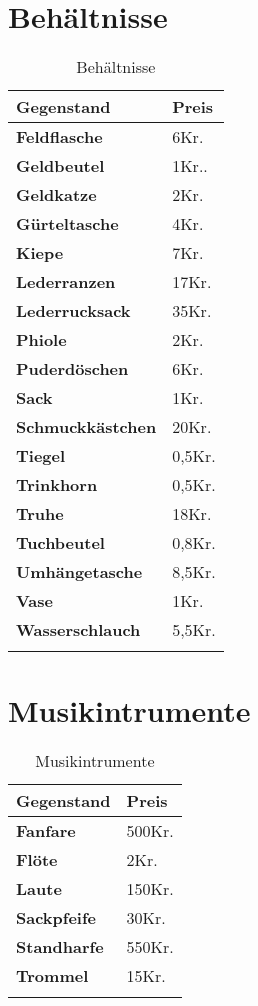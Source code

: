 \section{Behältnisse}
\begin{longtable}{|p{5cm}|p{2cm}|}
\hline
\textbf{Gegenstand} & \textbf{Preis} \\ \hline
\textbf{Feldflasche} & 6Kr. \\ \hline
\textbf{Geldbeutel} & 1Kr.. \\ \hline
\textbf{Geldkatze} & 2Kr. \\ \hline
\textbf{Gürteltasche} & 4Kr. \\ \hline
\textbf{Kiepe} & 7Kr. \\ \hline
\textbf{Lederranzen} & 17Kr. \\ \hline
\textbf{Lederrucksack} & 35Kr. \\ \hline
\textbf{Phiole} & 2Kr. \\ \hline
\textbf{Puderdöschen} & 6Kr. \\ \hline
\textbf{Sack} & 1Kr. \\ \hline
\textbf{Schmuckkästchen} & 20Kr. \\ \hline
\textbf{Tiegel} & 0,5Kr. \\ \hline
\textbf{Trinkhorn} & 0,5Kr. \\ \hline
\textbf{Truhe} & 18Kr. \\ \hline
\textbf{Tuchbeutel} & 0,8Kr. \\ \hline
\textbf{Umhängetasche} & 8,5Kr. \\ \hline
\textbf{Vase} & 1Kr. \\ \hline
\textbf{Wasserschlauch} & 5,5Kr. \\ \hline

\caption{Behältnisse}
\label{tab:Behältnisse}
\end{longtable}


\section{Musikintrumente}
\begin{longtable}{|p{5cm}|p{2cm}|}
\hline
\textbf{Gegenstand} & \textbf{Preis} \\ \hline
\textbf{Fanfare} & 500Kr. \\ \hline
\textbf{Flöte} & 2Kr. \\ \hline
\textbf{Laute} & 150Kr. \\ \hline
\textbf{Sackpfeife} & 30Kr. \\ \hline
\textbf{Standharfe} & 550Kr. \\ \hline
\textbf{Trommel} & 15Kr. \\ \hline

\caption{Musikintrumente}
\label{tab:Musikintrumente}
\end{longtable}


